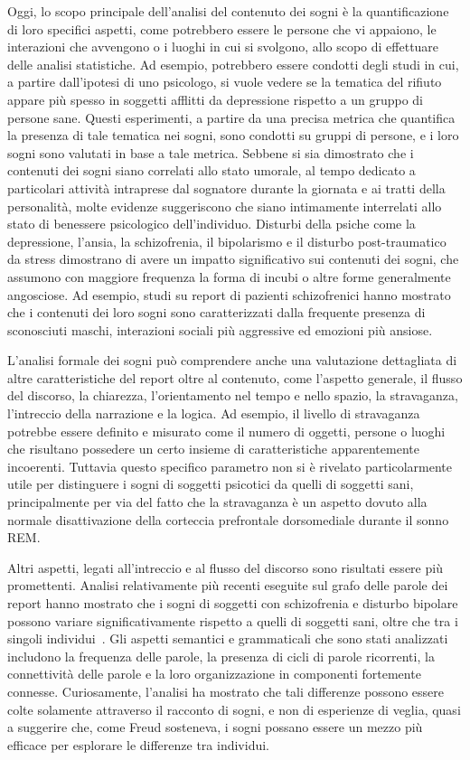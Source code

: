 Oggi, lo scopo principale dell'analisi del contenuto dei sogni è la quantificazione di loro specifici aspetti,
come potrebbero essere le persone che vi appaiono, le interazioni che avvengono o i luoghi in cui si svolgono,
allo scopo di effettuare delle analisi statistiche.
Ad esempio, potrebbero essere condotti degli studi in cui, a partire dall'ipotesi di uno psicologo, si vuole
vedere se la tematica del rifiuto appare più spesso in soggetti afflitti da depressione rispetto a un gruppo
di persone sane.
Questi esperimenti, a partire da una precisa metrica che quantifica la presenza di tale tematica nei
sogni, sono condotti su gruppi di persone, e i loro sogni sono valutati in base a tale metrica.
Sebbene si sia dimostrato che i contenuti dei sogni siano correlati allo stato umorale, al tempo
dedicato a particolari attività intraprese dal sognatore durante la giornata e ai tratti della personalità,
molte evidenze suggeriscono che siano intimamente interrelati allo stato di benessere psicologico dell'individuo.
Disturbi della psiche come la depressione, l'ansia, la schizofrenia, il bipolarismo e
il disturbo post-traumatico da stress dimostrano di avere un impatto significativo sui contenuti dei sogni,
che assumono con maggiore frequenza la forma di incubi o altre forme generalmente angosciose.
Ad esempio, studi su report di pazienti schizofrenici hanno mostrato che i contenuti dei loro sogni sono
caratterizzati dalla frequente presenza di sconosciuti maschi, interazioni sociali più aggressive ed
emozioni più ansiose. %

L'analisi formale dei sogni può comprendere anche una valutazione dettagliata di altre caratteristiche del report
oltre al contenuto, come l'aspetto generale, il flusso del discorso, la chiarezza, l'orientamento nel tempo e
nello spazio, la stravaganza, l'intreccio della narrazione e la logica.
Ad esempio, il livello di stravaganza potrebbe essere definito e misurato come il numero di oggetti, persone o
luoghi che risultano possedere un certo insieme di caratteristiche apparentemente incoerenti.
Tuttavia questo specifico parametro non si è rivelato particolarmente utile per distinguere i sogni di
soggetti psicotici da quelli di soggetti sani, principalmente per via del fatto che la stravaganza è un aspetto
dovuto alla normale disattivazione della corteccia prefrontale dorsomediale durante il sonno REM\@.

Altri aspetti, legati all'intreccio e al flusso del discorso sono risultati essere più promettenti.
Analisi relativamente più recenti eseguite sul grafo delle parole dei report hanno mostrato che i sogni di soggetti con
schizofrenia e disturbo bipolare possono variare significativamente rispetto a quelli di soggetti sani,
oltre che tra i singoli individui~\cite{mota2014graph}.
Gli aspetti semantici e grammaticali che sono stati analizzati includono la frequenza delle parole, la presenza di
cicli di parole ricorrenti, la connettività delle parole e la loro organizzazione in componenti
fortemente connesse.
Curiosamente, l'analisi ha mostrato che tali differenze possono essere colte solamente attraverso il racconto di
sogni, e non di esperienze di veglia, quasi a suggerire che, come Freud sosteneva, i sogni possano essere un mezzo più
efficace per esplorare le differenze tra individui.